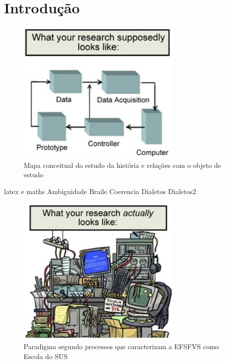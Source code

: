 \chapter{Introdução}
\label{chap:introducao}

\lipsum[2]

\begin{figure}[h!]
	\caption{Mapa conceitual do estudo da história e relações com o objeto de estudo}
	\label{fig_mapa}
	\begin{center}
		\includegraphics[width=8cm]{capitulos/figuras/figura-1}		
	\end{center}
\end{figure}

\lipsum[2]
\lipsum[2]
\lipsum[2]

\Gls{latex} e \gls{maths}
\Gls{Ambiguidade}
\Gls{Braile}
\Gls{Coerencia}
\Gls{Dialetos}
\Gls{Dialetos2}

\begin{figure}[h!]
	\caption{Paradigma segundo processos que caracterizam a EFSFVS como Escola do SUS}
	\label{fig_paradigma}
	\begin{center}
		\includegraphics[width=8cm]{capitulos/figuras/figura-2}
	\end{center}
\end{figure}

